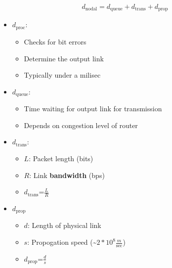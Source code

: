 \documentclass[12pt]{report}
\begin{document}
\begin{align*}
  d_{\text{nodal}}=d_{\text{queue}}+d_{\text{trans}}+d_{\text{prop}}
\end{align*}
\begin{itemize}
  \item $d_{\text{proc}}$:
        \begin{itemize}
          \item Checks for bit errors
          \item Determine the output link
                \item Typically under a milisec
        \end{itemize}
        \item $d_{\text{queue}}$:
        \begin{itemize}
          \item Time waiting for output link for transmission
                \item Depends on congestion level of router
        \end{itemize}
        \item $d_{\text{trans}}$:
        \begin{itemize}
                \item $L$: Packet length (bits)
                \item $R$: Link \textbf{bandwidth} (bps)
                \item \textbf{$d_{\text{trans}}$}=$\frac{L}{R}$
        \end{itemize}
        \item $d_{\text{prop}}$
        \begin{itemize}
          \item $d$: Length of physical link
                \item $s$: Propogation speed (\~$2*10^{8}\frac{m}{\text{sec}}$)
                \item \textbf{$d_{\text{prop}}$}=$\frac{d}{s}$
        \end{itemize}
\end{itemize}

\end{document}
